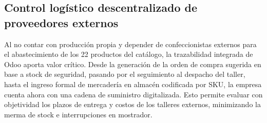 \subsection{Control logístico descentralizado de proveedores externos}
\begin{indentedsubsection}
Al no contar con producción propia y depender de confeccionistas externos para el abastecimiento de los 22 productos del catálogo, la trazabilidad integrada de Odoo aporta valor crítico. Desde la generación de la orden de compra sugerida en base a stock de seguridad, pasando por el seguimiento al despacho del taller, hasta el ingreso formal de mercadería en almacén codificada por SKU, la empresa cuenta ahora con una cadena de suministro digitalizada. Esto permite evaluar con objetividad los plazos de entrega y costos de los talleres externos, minimizando la merma de stock e interrupciones en mostrador.
\end{indentedsubsection}
